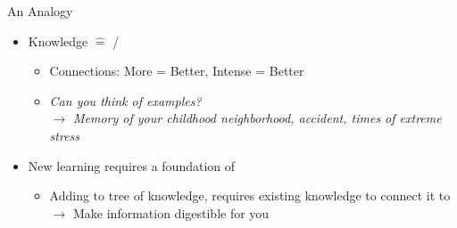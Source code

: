 \documentclass{ercisbeamer}
\begin{document}
\begin{frame}{An Analogy}
    \begin{tbox}
        \begin{itemize}
            \item Knowledge $\widehat =$   /  
            \begin{itemize}
                \item Connections: More = Better, Intense = Better
                \item \emph{Can you think of examples?} \pause \\ $\rightarrow$ \emph{Memory of your childhood neighborhood, accident, times of extreme stress}
            \end{itemize}
            \item New learning requires a foundation of 
            \begin{itemize}
                \item Adding to tree of knowledge, requires existing knowledge to connect it to \\ $\rightarrow$ Make information digestible for you
            \end{itemize}
        \end{itemize}
    \end{tbox}
\end{frame}
\setbgimage{}
\end{document}
